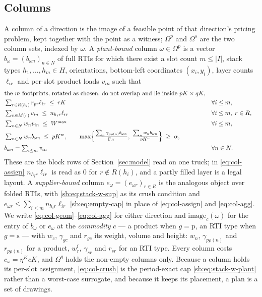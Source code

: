 \subsection{Columns}
\label{sec:columns}

A column of a direction is the image of a feasible point of that
direction's pricing problem, kept together with the point as a witness;
$\Omega^{p}$ and $\Omega^{s}$ are the two column sets, indexed by
$\omega$. A \emph{plant-bound} column $\omega\in\Omega^{p}$ is a vector
$b_{\omega}=(b_{\omega n})_{n\in N}$ of full RTIs for which there exist
a slot count $m\le|I|$, stack types $h_{1},\dots,h_{m}\in H$,
orientations, bottom-left coordinates $(x_{i},y_{i})$, layer counts
$\ell_{ir}$ and per-slot product loads $v_{in}$ such that
\begin{align}
&\text{the $m$ footprints, rotated as chosen, do not overlap and lie
   inside } pK\times qK,
   \label{eq:col-geom}\\
&\textstyle\sum_{r\in R(h_{i})} r_{pr}\ell_{ir}\;\le\;rK
   &&\forall i\le m,
   \label{eq:col-height}\\
&\textstyle\sum_{n\in M(r)} v_{in}\;\le\;n_{h_{i}r}\ell_{ir}
   &&\forall i\le m,\;r\in R,
   \label{eq:col-assign}\\
&\textstyle\sum_{n\in N} w_{n}v_{in}\;\le\;W^{\max}
   &&\forall i\le m,
   \label{eq:col-crush}\\
&\textstyle\sum_{n\in N} w_{n}b_{\omega n}\;\le\;pK^{w},
   \qquad
   \max\Bigl\{\tfrac{\sum_{n}\gamma_{p\rho(n)}b_{\omega n}}{\Gamma_{K}},\;
              \tfrac{\sum_{n}w_{n}b_{\omega n}}{pK^{w}}\Bigr\}\;\ge\;\alpha,
   \label{eq:col-truck}\\
&b_{\omega n}=\textstyle\sum_{i\le m} v_{in}
   &&\forall n\in N.
   \label{eq:col-agg}
\end{align}
These are the block rows of Section~\ref{sec:model} read on one truck;
in \eqref{eq:col-assign} $n_{h_{i}r}\ell_{ir}$ is read as $0$ for
$r\notin R(h_{i})$, and a partly filled layer is a legal layout. A
\emph{supplier-bound} column $e_{\omega}=(e_{\omega r})_{r\in R}$ is
the analogous object over folded RTIs, with \eqref{sb:eq:stack-w-sup}
as its crush condition and
$e_{\omega r}\le\sum_{i\le m}n_{h_{i}r}\ell_{ir}$
\eqref{sb:eq:empty-cap} in place of \eqref{eq:col-assign} and
\eqref{eq:col-agg}. We write \eqref{eq:col-geom}--\eqref{eq:col-agg}
for either direction and $\mathrm{image}_{c}(\omega)$ for the entry of
$b_{\omega}$ or $e_{\omega}$ at the \emph{commodity} $c$ --- a product
when $g=\mathrm{p}$, an RTI type when $g=\mathrm{s}$ --- with $w_{c}$,
$\gamma_{gc}$ and $r_{gc}$ its weight, volume and height: $w_{n}$,
$\gamma_{p\rho(n)}$ and $r_{p\rho(n)}$ for a product, $w^{\mathrm{f}}_{r}$,
$\gamma_{sr}$ and $r_{sr}$ for an RTI type. Every column
costs $c_{\omega}=\eta^{K}cK$, and $\Omega^{g}$ holds the non-empty
columns only. Because a column holds its per-slot assignment,
\eqref{eq:col-crush} is the period-exact cap
\eqref{sb:eq:stack-w-plant} rather than a worst-case surrogate, and
because it keeps its placement, a plan is a set of drawings.

